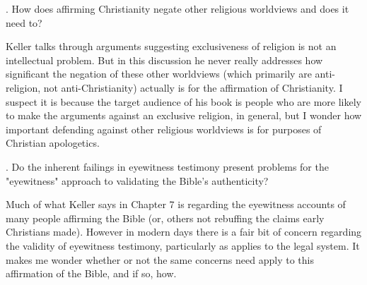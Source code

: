 \documentclass[12pt]{turabian-researchpaper}
\begin{document}
. How does affirming Christianity negate other religious worldviews and does it need to?

Keller talks through arguments suggesting exclusiveness of religion is not an intellectual problem. But in this discussion\autocite[pg.11-13]{keller2008reason} he never really addresses how significant the negation of these other worldviews (which primarily are anti-religion, not anti-Christianity) actually is for the affirmation of Christianity. I suspect it is because the target audience of his book is people who are more likely to make the arguments against an exclusive religion, in general, but I wonder how important defending against other religious worldviews is for purposes of Christian apologetics.

. Do the inherent failings in eyewitness testimony present problems for the "eyewitness" approach to validating the Bible's authenticity?

Much of what Keller says in Chapter 7 is regarding the eyewitness accounts of many people affirming the Bible (or, others not rebuffing the claims early Christians made). However in modern days there is a fair bit of concern regarding the validity of eyewitness testimony, particularly as applies to the legal system. It makes me wonder whether or not the same concerns need apply to this affirmation of the Bible, and if so, how.

\newpage
\printbibliography
\end{document}
